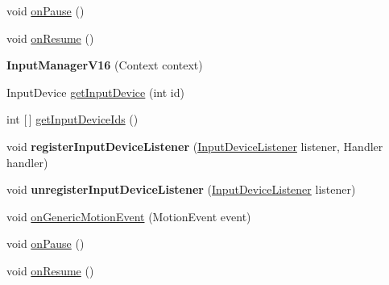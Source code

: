 \begin{DoxyCompactItemize}
\item 
void \hyperlink{classorg_1_1cocos2dx_1_1lib_1_1inputmanagercompat_1_1InputManagerV16_a06c3db7d607a8a43c9d27565dd759340}{on\+Pause} ()
\item 
void \hyperlink{classorg_1_1cocos2dx_1_1lib_1_1inputmanagercompat_1_1InputManagerV16_a06cacfc2a899e281361bfd190d35bcec}{on\+Resume} ()
\item 
\mbox{\label{classorg_1_1cocos2dx_1_1lib_1_1inputmanagercompat_1_1InputManagerV16_a670064e86bdd3a785c5693bdf3cfaa1a}} 
{\bfseries Input\+Manager\+V16} (Context context)
\item 
Input\+Device \hyperlink{classorg_1_1cocos2dx_1_1lib_1_1inputmanagercompat_1_1InputManagerV16_ab7a4f0ce39114a0c891c2c6642f61e4c}{get\+Input\+Device} (int id)
\item 
int \mbox{[}$\,$\mbox{]} \hyperlink{classorg_1_1cocos2dx_1_1lib_1_1inputmanagercompat_1_1InputManagerV16_a41ff1ae73d68436be41859a4ac5f2e62}{get\+Input\+Device\+Ids} ()
\item 
\mbox{\label{classorg_1_1cocos2dx_1_1lib_1_1inputmanagercompat_1_1InputManagerV16_a4584703fef7712ae9dbaa12a1f4a679d}} 
void {\bfseries register\+Input\+Device\+Listener} (\hyperlink{interfaceorg_1_1cocos2dx_1_1lib_1_1inputmanagercompat_1_1InputManagerCompat_1_1InputDeviceListener}{Input\+Device\+Listener} listener, Handler handler)
\item 
\mbox{\label{classorg_1_1cocos2dx_1_1lib_1_1inputmanagercompat_1_1InputManagerV16_a97aa2ca35f221a36ae04f6710e54a435}} 
void {\bfseries unregister\+Input\+Device\+Listener} (\hyperlink{interfaceorg_1_1cocos2dx_1_1lib_1_1inputmanagercompat_1_1InputManagerCompat_1_1InputDeviceListener}{Input\+Device\+Listener} listener)
\item 
void \hyperlink{classorg_1_1cocos2dx_1_1lib_1_1inputmanagercompat_1_1InputManagerV16_ab72ef0c7bf1fcc4cbd2f609d2e47f745}{on\+Generic\+Motion\+Event} (Motion\+Event event)
\item 
void \hyperlink{classorg_1_1cocos2dx_1_1lib_1_1inputmanagercompat_1_1InputManagerV16_a06c3db7d607a8a43c9d27565dd759340}{on\+Pause} ()
\item 
void \hyperlink{classorg_1_1cocos2dx_1_1lib_1_1inputmanagercompat_1_1InputManagerV16_a06cacfc2a899e281361bfd190d35bcec}{on\+Resume} ()
\end{DoxyCompactItemize}


